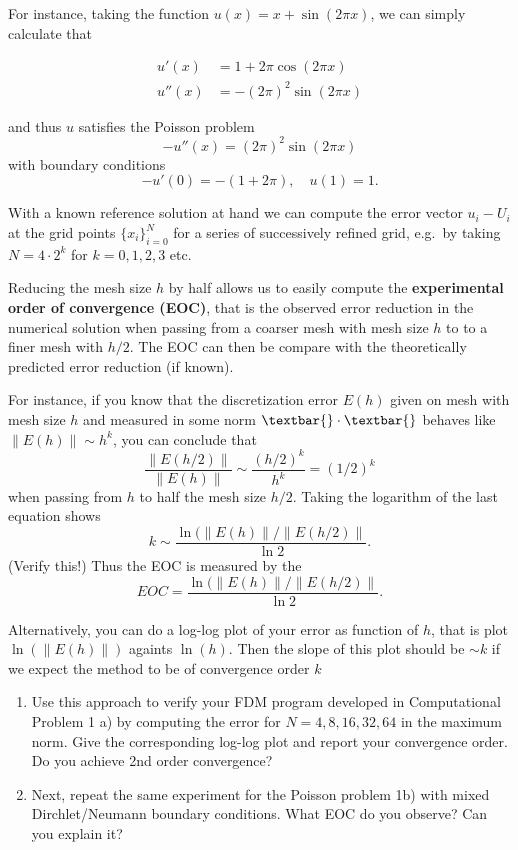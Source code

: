 \documentclass[11pt]{article}
\begin{document}
For instance, taking the function \(u(x) = x + \sin(2 \pi x)\), we can
simply calculate that

\begin{align}
 u'(x) &= 1 + 2\pi \cos(2\pi x)
 \\
 u''(x) &= - (2\pi)^2 \sin(2\pi x)
\end{align}

and thus \(u\) satisfies the Poisson problem \[
-u''(x) = (2\pi)^2 \sin(2\pi x)
\] with boundary conditions \[
-u'(0) = -(1+2\pi), \quad u(1) = 1.
\]

With a known reference solution at hand we can compute the error vector
\(u_i - U_i\) at the grid points \(\{x_i\}_{i=0}^N\) for a series of
successively refined grid, e.g.~by taking \(N = 4\cdot2^k\) for
\(k = 0, 1, 2, 3\) etc.

Reducing the mesh size \(h\) by half allows us to easily compute the
\textbf{experimental order of convergence (EOC)}, that is the observed
error reduction in the numerical solution when passing from a coarser
mesh with mesh size \(h\) to to a finer mesh with \(h/2\). The EOC can
then be compare with the theoretically predicted error reduction (if
known).

For instance, if you know that the discretization error \(E(h)\) given
on mesh with mesh size \(h\) and measured in some norm $ \textbar{}
\cdot \textbar{}$ behaves like \(\| E(h) \| \sim h^k\), you can
conclude that\\
\[
\dfrac{\|E(h/2)\|}{\|E(h)\|} \sim \dfrac{(h/2)^k}{h^k} = (1/2)^k
\] when passing from \(h\) to half the mesh size \(h/2\). Taking the
logarithm of the last equation shows \[
k \sim \dfrac{\ln(\|E(h)\|/\|E(h/2)\|}{\ln 2}. 
\] (Verify this!) Thus the EOC is measured by the \[
EOC = \dfrac{\ln(\|E(h)\|/\|E(h/2)\|}{\ln 2}.
\]

Alternatively, you can do a log-log plot of your error as function of
\(h\), that is plot \(\ln (\| E(h)\|)\) againts \(\ln(h)\). Then the
slope of this plot should be \(\sim k\) if we expect the method to be of
convergence order \(k\)

\begin{enumerate}
\def\labelenumi{\alph{enumi})}
\item
  Use this approach to verify your FDM program developed in
  Computational Problem 1 a) by computing the error for
  \(N= 4, 8, 16, 32, 64\) in the maximum norm. Give the corresponding
  log-log plot and report your convergence order. Do you achieve 2nd
  order convergence?
\item
  Next, repeat the same experiment for the Poisson problem 1b) with
  mixed Dirchlet/Neumann boundary conditions. What EOC do you observe?
  Can you explain it?
\end{enumerate}
\end{document}
